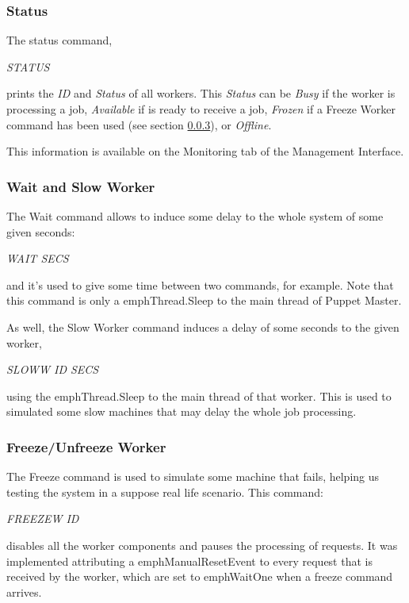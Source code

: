 \documentclass[times, 10pt,twocolumn]{article}
\begin{document}
          \subsubsection{Status}

          The status command,

          \emph{STATUS}

          prints the \emph{ID} and \emph{Status} of all workers. This \emph{Status} can be  \emph{Busy} if the worker is processing a job, \emph{Available} if is ready to receive a job, \emph{Frozen} if a Freeze Worker command has been used (see section \ref{freeze}), or \emph{Offline}.

          This information is available on the Monitoring tab of the Management Interface.
                 	
          \subsubsection{Wait and Slow Worker}
			The Wait command allows to induce some delay to the whole system of some given seconds:

            \emph{WAIT SECS}

            and it's used to give some time between two commands, for example. Note that this command is only a emph{Thread.Sleep} to the main thread of Puppet Master.

            As well, the Slow Worker command induces a delay of some seconds to the given worker,

            \emph{SLOWW ID SECS}

			using the emph{Thread.Sleep} to the main thread of that worker. This is used to simulated some slow machines that may delay the whole job processing.

            \subsubsection{Freeze/Unfreeze Worker} \label{freeze}
            The Freeze command is used to simulate some machine that fails, helping us testing the system in a suppose real life scenario. This command:

            \emph{FREEZEW ID}

            disables all the worker components and pauses the processing of requests.
            It was implemented attributing a emph{ManualResetEvent} to every request that is received by the worker, which are set to emph{WaitOne} when a freeze command arrives.
\end{document}
